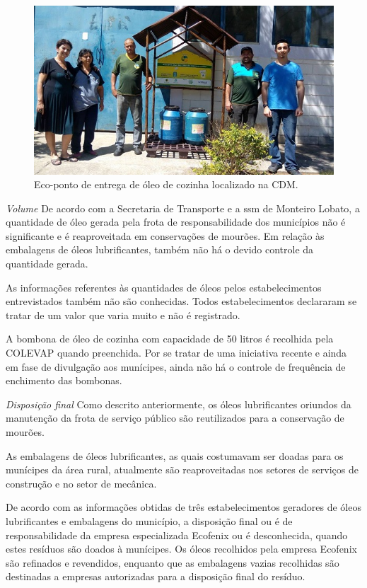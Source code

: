 \begin{description}
	\begin{figure}
		\centering
		\includegraphics[width=0.75\linewidth]{produtos/prodtres/image094}
		\caption{Eco-ponto de entrega de óleo de cozinha localizado na CDM.}
		\label{fig:image094}
	\end{figure}
	
	
	\subitem \textit{Volume} 
	De acordo com a Secretaria de Transporte e a \gls{ssm} de Monteiro Lobato, a quantidade de óleo gerada pela frota de responsabilidade dos municípios não é significante e é reaproveitada em conservações de mourões. Em relação às embalagens de óleos lubrificantes, também não há o devido controle da quantidade gerada.
	
	As informações referentes às quantidades de óleos pelos estabelecimentos entrevistados também não são conhecidas. Todos estabelecimentos declararam se tratar de um valor que varia muito e não é registrado.
	
	A bombona de óleo de cozinha com capacidade de 50 litros é recolhida pela COLEVAP quando preenchida. Por se tratar de uma iniciativa recente e ainda em fase de divulgação aos munícipes, ainda não há o controle de frequência de enchimento das bombonas.
	
	\subitem \textit{Disposição final}
	Como descrito anteriormente, os óleos lubrificantes oriundos da manutenção da frota de serviço público são reutilizados para a conservação de mourões. 
	
	As embalagens de óleos lubrificantes, as quais costumavam ser doadas para os munícipes da área rural, atualmente são reaproveitadas nos setores de serviços de construção e no setor de mecânica.
	
	De acordo com as informações obtidas de três estabelecimentos geradores de óleos lubrificantes e embalagens do município, a disposição final ou é de responsabilidade da empresa especializada Ecofenix ou é desconhecida, quando estes resíduos são doados à munícipes. Os óleos recolhidos pela empresa Ecofenix são refinados e revendidos, enquanto que as embalagens vazias recolhidas são destinadas a empresas autorizadas para a disposição final do resíduo.
	

\end{description}
